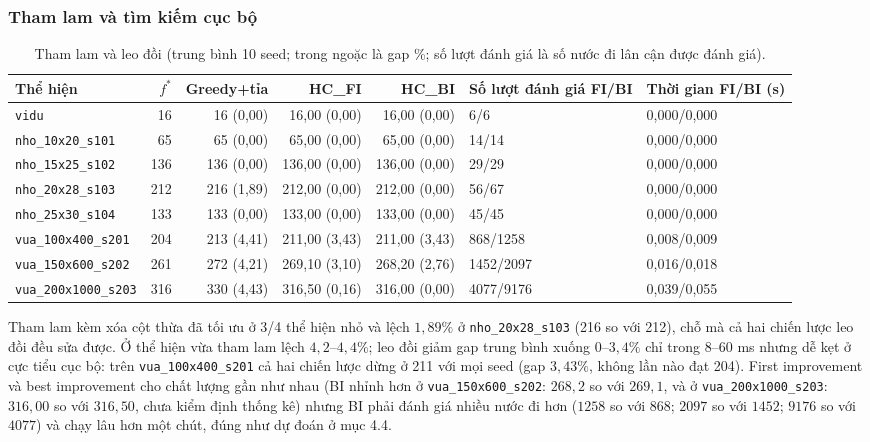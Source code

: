 \documentclass[a4paper,12pt]{article}
\begin{document}
\subsubsection{Tham lam và tìm kiếm cục bộ}
\begin{table}[htbp]
\centering
\caption{Tham lam và leo đồi (trung bình 10 seed; trong ngoặc là gap \%; số lượt đánh giá là số nước đi lân cận được đánh giá).}
\footnotesize
\setlength{\tabcolsep}{3pt}
\begin{tabularx}{\textwidth}{lrrrrYY}
\toprule
Thể hiện & $f^*$ & Greedy+tỉa & HC\_FI & HC\_BI & Số lượt đánh giá FI/BI & Thời gian FI/BI (s)\\
\midrule
\texttt{vidu} & 16 & 16 (0{,}00) & 16{,}00 (0{,}00) & 16{,}00 (0{,}00) & 6/6 & 0{,}000/0{,}000\\
\texttt{nho\_10x20\_s101} & 65 & 65 (0{,}00) & 65{,}00 (0{,}00) & 65{,}00 (0{,}00) & 14/14 & 0{,}000/0{,}000\\
\texttt{nho\_15x25\_s102} & 136 & 136 (0{,}00) & 136{,}00 (0{,}00) & 136{,}00 (0{,}00) & 29/29 & 0{,}000/0{,}000\\
\texttt{nho\_20x28\_s103} & 212 & 216 (1{,}89) & 212{,}00 (0{,}00) & 212{,}00 (0{,}00) & 56/67 & 0{,}000/0{,}000\\
\texttt{nho\_25x30\_s104} & 133 & 133 (0{,}00) & 133{,}00 (0{,}00) & 133{,}00 (0{,}00) & 45/45 & 0{,}000/0{,}000\\
\texttt{vua\_100x400\_s201} & 204 & 213 (4{,}41) & 211{,}00 (3{,}43) & 211{,}00 (3{,}43) & 868/1258 & 0{,}008/0{,}009\\
\texttt{vua\_150x600\_s202} & 261 & 272 (4{,}21) & 269{,}10 (3{,}10) & 268{,}20 (2{,}76) & 1452/2097 & 0{,}016/0{,}018\\
\texttt{vua\_200x1000\_s203} & 316 & 330 (4{,}43) & 316{,}50 (0{,}16) & 316{,}00 (0{,}00) & 4077/9176 & 0{,}039/0{,}055\\
\bottomrule
\end{tabularx}
\label{tbl:ls}
\end{table}
Tham lam kèm xóa cột thừa đã tối ưu ở 3/4 thể hiện nhỏ và lệch $1{,}89\%$ ở \texttt{nho\_20x28\_s103} (216 so với 212), chỗ mà cả hai chiến lược leo đồi đều sửa được. Ở thể hiện vừa tham lam lệch $4{,}2$--$4{,}4\%$; leo đồi giảm gap trung bình xuống $0$--$3{,}4\%$ chỉ trong $8$--$60$ ms nhưng dễ kẹt ở cực tiểu cục bộ: trên \texttt{vua\_100x400\_s201} cả hai chiến lược dừng ở 211 với mọi seed (gap $3{,}43\%$, không lần nào đạt 204). First improvement và best improvement cho chất lượng gần như nhau (BI nhỉnh hơn ở \texttt{vua\_150x600\_s202}: $268{,}2$ so với $269{,}1$, và ở \texttt{vua\_200x1000\_s203}: $316{,}00$ so với $316{,}50$, chưa kiểm định thống kê) nhưng BI phải đánh giá nhiều nước đi hơn ($1258$ so với $868$; $2097$ so với $1452$; $9176$ so với $4077$) và chạy lâu hơn một chút, đúng như dự đoán ở mục 4.4.
\end{document}
